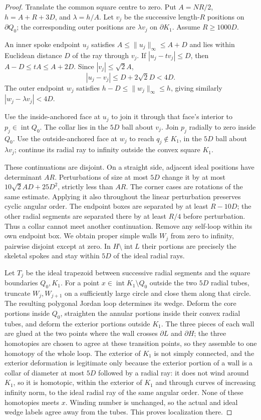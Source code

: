 \documentclass[11pt,a4paper]{article}
\theoremstyle{remark}
\begin{document}
\begin{proof}
Translate the common square centre to zero.  Put $A=NR/2$,
$h=A+R+3D$, and $\lambda=h/A$.  Let $v_j$ be the successive length-$R$
positions on $\partial Q_0$; the corresponding outer positions are
$\lambda v_j$ on $\partial K_1$.  Assume $R\ge1000D$.

An inner spoke endpoint $u_j$ satisfies
$A\le\|u_j\|_\infty\le A+D$ and lies within Euclidean distance $D$
of the ray through $v_j$.  If $|u_j-tv_j|\le D$, then
$A-D\le tA\le A+2D$.  Since $|v_j|\le\sqrt2A$,
\[
 |u_j-v_j|\le D+2\sqrt2D<4D.
\]
The outer endpoint $w_j$ satisfies
$h-D\le\|w_j\|_\infty\le h$, giving similarly
$|w_j-\lambda v_j|<4D$.

Use the inside-anchored face at $u_j$ to join it through that face's
interior to $p_j\in\operatorname{int}Q_0$.  The collar lies in the
$5D$ ball about $v_j$.  Join $p_j$ radially to zero inside $Q_0$.
Use the outside-anchored face at $w_j$ to reach
$q_j\notin K_1$, in the $5D$ ball about $\lambda v_j$; continue its
radial ray to infinity outside the convex square $K_1$.

These continuations are disjoint.  On a straight side, adjacent ideal
positions have determinant $AR$.  Perturbations of size at most $5D$
change it by at most $10\sqrt2AD+25D^2$, strictly less than $AR$.
The corner cases are rotations of the same estimate.  Applying it also
throughout the linear perturbation preserves cyclic angular order.
The endpoint boxes are separated by at least $R-10D$; the other radial
segments are separated there by at least $R/4$ before perturbation.
Thus a collar cannot meet another continuation.  Remove any self-loop
within its own endpoint box.  We obtain proper simple walls $W_j$ from
zero to infinity, pairwise disjoint except at zero.  In
$H\setminus\operatorname{int}L$ their portions are precisely the
skeletal spokes and stay within $5D$ of the ideal radial rays.

Let $T_j$ be the ideal trapezoid between successive radial segments and
the square boundaries $Q_0,K_1$.  For a point
$x\in\operatorname{int}K_1\setminus Q_0$ outside the two $5D$ radial
tubes, truncate $W_j,W_{j+1}$ on a sufficiently large circle and close
them along that circle.  The resulting polygonal Jordan loop determines
its wedge.  Deform the core portions inside $Q_0$, straighten the
annular portions inside their convex radial tubes, and deform the
exterior portions outside $K_1$.  The three pieces of each wall are glued
at the two points where the wall crosses $\partial L$ and $\partial H$;
the three homotopies are chosen to agree at these transition points, so
they assemble to one homotopy of the whole loop.  The exterior of $K_1$
is not simply connected, and the exterior deformation is legitimate only
because the exterior portion of a wall is a collar of diameter at most
$5D$ followed by a radial ray: it does not wind around $K_1$, so it is
homotopic, within the exterior of $K_1$ and through curves of increasing
infinity norm, to the ideal radial ray of the same angular order.  None
of these homotopies meets $x$.  Winding number is unchanged, so the actual and ideal wedge
labels agree away from the tubes.  This proves localization there.


\end{proof}
\end{document}
